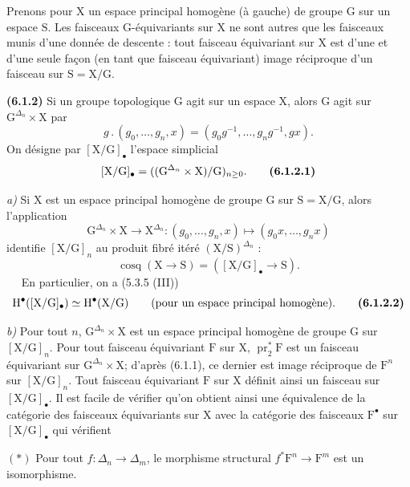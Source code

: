 \documentclass[11pt,leqno]{article}
\newcommand{\Page}[1]{\ifvmode\noindent\else\unskip\ \fi{\footnotesize\textcolor{gray}{[p.\,#1]}}\ \ignorespaces}
\begin{document}
Prenons pour \(\mathrm{X}\) un espace principal homogène (à gauche) de groupe \(\mathrm{G}\) sur un espace \(\mathrm{S}\). Les faisceaux \(\mathrm{G}\)-équivariants sur \(\mathrm{X}\) ne sont autres que les faisceaux munis d’une donnée de descente : tout faisceau équivariant sur \(\mathrm{X}\) est d’une et d’une seule façon (en tant que faisceau équivariant) image réciproque d’un faisceau sur \(\mathrm{S}=\mathrm{X}/\mathrm{G}\).

\textbf{(6.1.2)} Si un groupe topologique \(\mathrm{G}\) agit sur un espace \(\mathrm{X}\), alors \(\mathrm{G}\) agit sur \(\mathrm{G}^{\Delta_n}\times\mathrm{X}\) par
\[
g\mathbin{.}(g_0,\ldots,g_n,x)
=(g_0g^{-1},\ldots,g_ng^{-1},gx).
\]
On désigne par \([\mathrm{X}/\mathrm{G}]_{\bullet}\) l’espace simplicial
\[
[\mathrm{X}/\mathrm{G}]_{\bullet}
=((\mathrm{G}^{\Delta_n}\times\mathrm{X})/\mathrm{G})_{n\geq 0}.
\tag*{\textbf{(6.1.2.1)}}
\]

\textit{a)} Si \(\mathrm{X}\) est un espace principal homogène de groupe \(\mathrm{G}\) sur \(\mathrm{S}=\mathrm{X}/\mathrm{G}\), alors l’application
\[
\mathrm{G}^{\Delta_n}\times\mathrm{X}\to\mathrm{X}^{\Delta_n}:
(g_0,\ldots,g_n,x)\mapsto(g_0x,\ldots,g_nx)
\]
identifie \([\mathrm{X}/\mathrm{G}]_n\) au produit fibré itéré \((\mathrm{X}/\mathrm{S})^{\Delta_n}\) :
\[
\operatorname{cosq}(\mathrm{X}\to\mathrm{S})
=([\mathrm{X}/\mathrm{G}]_{\bullet}\to\mathrm{S}).
\]
\Page{17}
En particulier, on a (5.3.5 (III))
\[
\mathrm{H}^{\bullet}([\mathrm{X}/\mathrm{G}]_{\bullet})
\simeq\mathrm{H}^{\bullet}(\mathrm{X}/\mathrm{G})
\qquad\text{(pour un espace principal homogène).}
\tag*{\textbf{(6.1.2.2)}}
\]

\textit{b)} Pour tout \(n\), \(\mathrm{G}^{\Delta_n}\times\mathrm{X}\) est un espace principal homogène de groupe \(\mathrm{G}\) sur \([\mathrm{X}/\mathrm{G}]_n\). Pour tout faisceau équivariant \(\mathrm{F}\) sur \(\mathrm{X}\), \(\operatorname{pr}_2^*\mathrm{F}\) est un faisceau équivariant sur \(\mathrm{G}^{\Delta_n}\times\mathrm{X}\); d’après (6.1.1), ce dernier est image réciproque de \(\mathrm{F}^n\) sur \([\mathrm{X}/\mathrm{G}]_n\). Tout faisceau équivariant \(\mathrm{F}\) sur \(\mathrm{X}\) définit ainsi un faisceau sur \([\mathrm{X}/\mathrm{G}]_{\bullet}\). Il est facile de vérifier qu’on obtient ainsi une équivalence de la catégorie des faisceaux équivariants sur \(\mathrm{X}\) avec la catégorie des faisceaux \(\mathrm{F}^{\bullet}\) sur \([\mathrm{X}/\mathrm{G}]_{\bullet}\) qui vérifient

\((\ast)\) Pour tout \(f:\Delta_n\to\Delta_m\), le morphisme structural \(f^*\mathrm{F}^n\to\mathrm{F}^m\) est un isomorphisme.
\end{document}

